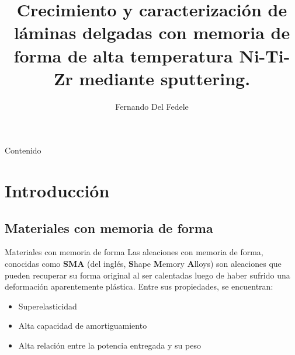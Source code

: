 \documentclass[11pt]{beamer}
\author{Fernando Del Fedele}
\title{Crecimiento y caracterización de
láminas delgadas con memoria de
forma de alta temperatura Ni-Ti-Zr
mediante sputtering.}
\begin{document}
\begin{frame}
\titlepage
\end{frame}

\begin{frame}[allowframebreaks]{Contenido}
\tableofcontents
\end{frame}

\section{Introducción}

	\subsection{Materiales con memoria de forma}
		\begin{frame}{Materiales con memoria de forma}
			Las aleaciones con memoria de forma, conocidas como \textbf{SMA} (del inglés, \textbf{S}hape \textbf{M}emory \textbf{A}lloys) son aleaciones que pueden recuperar su forma original al ser calentadas luego de haber sufrido una deformación aparentemente plástica.
			Entre sus propiedades, se encuentran:
			\begin{itemize}
				\item Superelasticidad
				\item Alta capacidad de amortiguamiento
				\item Alta relación entre la potencia entregada y su peso
			\end{itemize}
		\end{frame}
			
\end{document}
